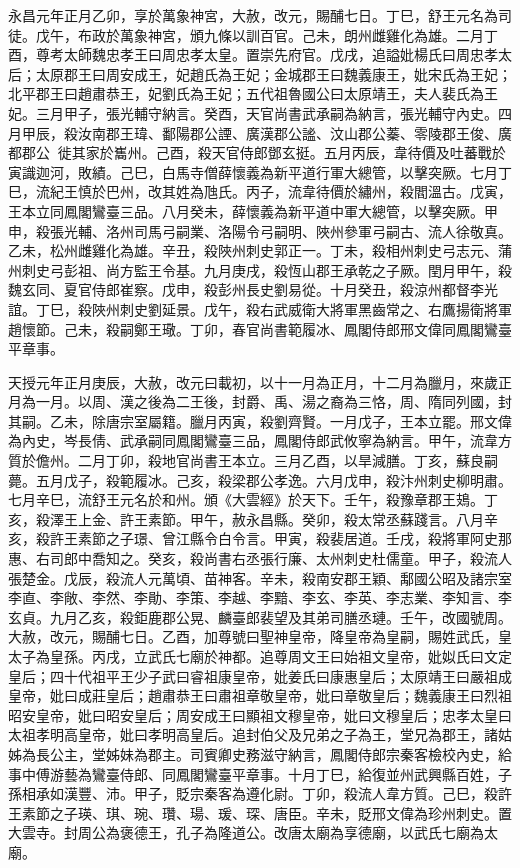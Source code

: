 \begin{pinyinscope}
 永昌元年正月乙卯，享於萬象神宮，大赦，改元，賜酺七日。丁巳，舒王元名為司徒。戊午，布政於萬象神宮，頒九條以訓百官。己未，朗州雌雞化為雄。二月丁酉，尊考太師魏忠孝王曰周忠孝太皇。置崇先府官。戊戌，追謚妣楊氏曰周忠孝太后；太原郡王曰周安成王，妃趙氏為王妃；金城郡王曰魏義康王，妣宋氏為王妃；北平郡王曰趙肅恭王，妃劉氏為王妃；五代祖魯國公曰太原靖王，夫人裴氏為王妃。三月甲子，張光輔守納言。癸酉，天官尚書武承嗣為納言，張光輔守內史。四月甲辰，殺汝南郡王瑋、鄱陽郡公諲、廣漢郡公謐、汶山郡公蓁、零陵郡王俊、廣都郡公，徙其家於巂州。己酉，殺天官侍郎鄧玄挺。五月丙辰，韋待價及吐蕃戰於寅識迦河，敗績。己巳，白馬寺僧薛懷義為新平道行軍大總管，以擊突厥。七月丁巳，流紀王慎於巴州，改其姓為虺氏。丙子，流韋待價於繡州，殺閻溫古。戊寅，王本立同鳳閣鸞臺三品。八月癸未，薛懷義為新平道中軍大總管，以擊突厥。甲申，殺張光輔、洛州司馬弓嗣業、洛陽令弓嗣明、陜州參軍弓嗣古、流人徐敬真。乙未，松州雌雞化為雄。辛丑，殺陜州刺史郭正一。丁未，殺相州刺史弓志元、蒲州刺史弓彭祖、尚方監王令基。九月庚戌，殺恆山郡王承乾之子厥。閏月甲午，殺魏玄同、夏官侍郎崔察。戊申，殺彭州長史劉易從。十月癸丑，殺涼州都督李光誼。丁巳，殺陜州刺史劉延景。戊午，殺右武威衛大將軍黑齒常之、右鷹揚衛將軍趙懷節。己未，殺嗣鄭王璥。丁卯，春官尚書範履冰、鳳閣侍郎邢文偉同鳳閣鸞臺平章事。



 天授元年正月庚辰，大赦，改元曰載初，以十一月為正月，十二月為臘月，來歲正月為一月。以周、漢之後為二王後，封爵、禹、湯之裔為三恪，周、隋同列國，封其嗣。乙未，除唐宗室屬籍。臘月丙寅，殺劉齊賢。一月戊子，王本立罷。邢文偉為內史，岑長倩、武承嗣同鳳閣鸞臺三品，鳳閣侍郎武攸寧為納言。甲午，流韋方質於儋州。二月丁卯，殺地官尚書王本立。三月乙酉，以旱減膳。丁亥，蘇良嗣薨。五月戊子，殺範履冰。己亥，殺梁郡公孝逸。六月戊申，殺汴州刺史柳明肅。七月辛巳，流舒王元名於和州。頒《大雲經》於天下。壬午，殺豫章郡王鳷。丁亥，殺澤王上金、許王素節。甲午，赦永昌縣。癸卯，殺太常丞蘇踐言。八月辛亥，殺許王素節之子璟、曾江縣令白令言。甲寅，殺裴居道。壬戌，殺將軍阿史那惠、右司郎中喬知之。癸亥，殺尚書右丞張行廉、太州刺史杜儒童。甲子，殺流人張楚金。戊辰，殺流人元萬頃、苗神客。辛未，殺南安郡王穎、鄅國公昭及諸宗室李直、李敞、李然、李勛、李策、李越、李黯、李玄、李英、李志業、李知言、李玄貞。九月乙亥，殺鉅鹿郡公晃、麟臺郎裴望及其弟司膳丞璉。壬午，改國號周。大赦，改元，賜酺七日。乙酉，加尊號曰聖神皇帝，降皇帝為皇嗣，賜姓武氏，皇太子為皇孫。丙戌，立武氏七廟於神都。追尊周文王曰始祖文皇帝，妣姒氏曰文定皇后；四十代祖平王少子武曰睿祖康皇帝，妣姜氏曰康惠皇后；太原靖王曰嚴祖成皇帝，妣曰成莊皇后；趙肅恭王曰肅祖章敬皇帝，妣曰章敬皇后；魏義康王曰烈祖昭安皇帝，妣曰昭安皇后；周安成王曰顯祖文穆皇帝，妣曰文穆皇后；忠孝太皇曰太祖孝明高皇帝，妣曰孝明高皇后。追封伯父及兄弟之子為王，堂兄為郡王，諸姑姊為長公主，堂姊妹為郡主。司賓卿史務滋守納言，鳳閣侍郎宗秦客檢校內史，給事中傅游藝為鸞臺侍郎、同鳳閣鸞臺平章事。十月丁巳，給復並州武興縣百姓，子孫相承如漢豐、沛。甲子，貶宗秦客為遵化尉。丁卯，殺流人韋方質。己巳，殺許王素節之子瑛、琪、琬、瓚、瑒、瑗、琛、唐臣。辛未，貶邢文偉為珍州刺史。置大雲寺。封周公為褒德王，孔子為隆道公。改唐太廟為享德廟，以武氏七廟為太廟。




\end{pinyinscope}
